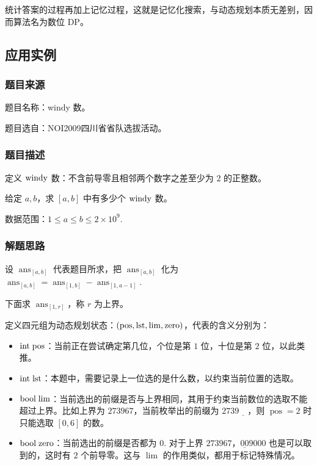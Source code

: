 \documentclass[a4paper, UTF8]{ctexart}
\begin{document}
统计答案的过程再加上记忆过程，这就是记忆化搜索，与动态规划本质无差别，因而算法名为数位
DP。

\subsection{应用实例}

\subsubsection{题目来源}

题目名称：windy 数。

题目选自：NOI2009四川省省队选拔活动。

\subsubsection{题目描述}

定义 \(\rm{windy}\) 数：不含前导零且相邻两个数字之差至少为 \(2\)
的正整数。

给定 \(a,b\)，求 \([a,b]\) 中有多少个 \(\rm{windy}\) 数。

数据范围：\(1\leq a\leq b\leq 2\times 10^9\).

\subsubsection{解题思路}

设 \(\operatorname{ans}_{[a,b]}\) 代表题目所求，把
\(\operatorname{ans}_{[a,b]}\) 化为
\(\operatorname{ans}_{[a,b]}=\operatorname{ans}_{[1,b]}-\operatorname{ans}_{[1,a-1]}\).

下面求 \(\operatorname{ans}_{[1,r]}\)，称 \(r\) 为上界。

定义四元组为动态规划状态：\(\rm{(pos,lst,lim,zero)}\)，代表的含义分别为：

\begin{itemize}
\tightlist
\item
  \(\rm{int\;pos}\)：当前正在尝试确定第几位，个位是第 \(1\) 位，十位是第
  \(2\) 位，以此类推。
\item
  \(\rm{int \;lst}\)：本题中，需要记录上一位选的是什么数，以约束当前位置的选取。
\item
  \(\rm{bool\;lim}\)：当前选出的前缀是否与上界相同，其用于约束当前数位的选取不能超过上界。比如上界为
  \(273967\)，当前枚举出的前缀为 \(2739\underline{\quad}\)，则
  \(\operatorname{pos}=2\) 时只能选取 \([0,6]\) 的数。
\item
  \(\rm{bool\;zero}\)：当前选出的前缀是否都为 \(0\). 对于上界
  \(273967\)，\(\underline{00}9000\) 也是可以取到的，这时有 \(2\)
  个前导零。这与 \(\operatorname{lim}\) 的作用类似，都用于标记特殊情况。
\end{itemize}
\end{document}
